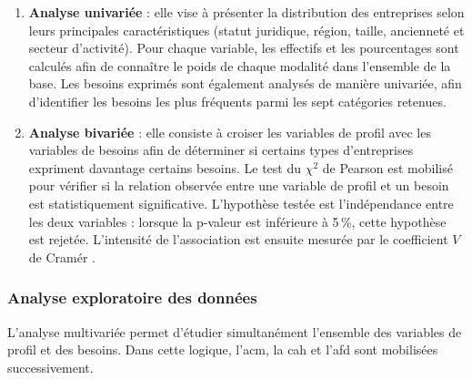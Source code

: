 \documentclass[12pt, a4paper, oneside]{report}
\begin{document}
\begin{enumerate}
  \item \textbf{Analyse univariée} : elle vise à présenter la distribution des entreprises selon leurs principales caractéristiques (statut juridique, région, taille, ancienneté et secteur d'activité). Pour chaque variable, les effectifs et les pourcentages sont calculés afin de connaître le poids de chaque modalité dans l'ensemble de la base. Les besoins exprimés sont également analysés de manière univariée, afin d'identifier les besoins les plus fréquents parmi les sept catégories retenues.

  \item \textbf{Analyse bivariée} : elle consiste à croiser les variables de profil avec les variables de besoins afin de déterminer si certains types d'entreprises expriment davantage certains besoins. Le test du $\chi^2$ de Pearson est mobilisé pour vérifier si la relation observée entre une variable de profil et un besoin est statistiquement significative. L'hypothèse testée est l'indépendance entre les deux variables : lorsque la p-valeur est inférieure à 5\,\%, cette hypothèse est rejetée. L'intensité de l'association est ensuite mesurée par le coefficient $V$ de Cramér \cite{cramer1946}.
\end{enumerate}

\subsubsection{Analyse exploratoire des données}

L'analyse multivariée permet d'étudier simultanément l'ensemble des variables de profil et des besoins. Dans cette logique, l'\gls{acm}, la \gls{cah} et l'\gls{afd} sont mobilisées successivement.
\end{document}

